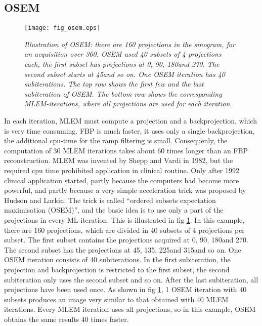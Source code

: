 \subsection{OSEM \label{sec:osem}}
\begin{figure}[tb]
\centering
\texttt{[image: fig\_osem.eps]}
\caption{\label{fig:osem} \emph{Illustration of OSEM: there are 160
    projections in the sinogram, for an acquisition over
    360\degrees. OSEM used 40 subsets of 4 projections each, the first
    subset has projections at 0\degrees, 90\degrees, 180\degrees and
    270\degrees. The second subset starts at 45\degrees and so on. One
    OSEM iteration has 40 subiterations. The top row shows the first
    few and the last subiteration of OSEM. The bottom row shows the
    corresponding MLEM-iterations, where all projections are used for
    each iteration.}}
\end{figure}
In each iteration, MLEM must compute a projection and a
backprojection, which is very time consuming. FBP is much faster, it
uses only a single backprojection, the additional cpu-time for the
ramp filtering is small. Consequenly, the computation of 30 MLEM
iterations takes about 60 times longer than an FBP
reconstruction. MLEM was invented by Shepp and Vardi in 1982, but the
required cpu time prohibited application in clinical routine. Only
after 1992 clinical application started, partly because the computers
had become more powerful, and partly because a very simple
acceleration trick was proposed by Hudson and Larkin. The trick is
called ``ordered subsets expectation maximisation (OSEM)'', and the
basic idea is to use only a part of the projections in every
ML-iteration. This is illustrated in fig \ref{fig:osem}. In this
example, there are 160 projections, which are divided in 40 subsets of
4 projections per subset. The first subset contains the projections
acquired at 0\degrees, 90\degrees, 180\degrees and 270\degrees. The
second subset has the projections at 45\degrees, 135\degrees,
225\degrees and 315\degrees and so on. One OSEM iteration consists of
40 subiterations. In the first subiteration, the projection and
backprojection is restricted to the first subset, the second
subiteration only uses the second subset and so on. After the last
subiteration, all projections have been used once. As shown in fig
\ref{fig:osem}, 1 OSEM iteration with 40 subsets produces an image
very similar to that obtained with 40 MLEM iterations. Every MLEM
iteration uses all projections, so in this example, OSEM obtains the
same results 40 times faster.

